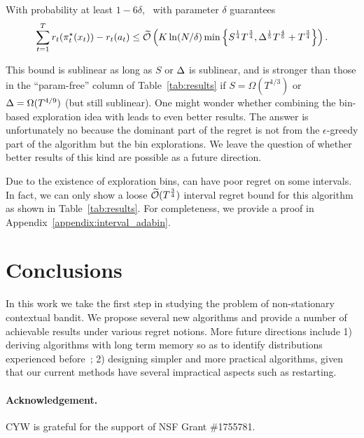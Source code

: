 
\begin{theorem} 
\label{thm:Ada3 regret}
With probability at least $1-6\delta$, \AdaBIN\ with parameter $\delta$ guarantees
\begin{align*}
\sum_{t=1}^T r_t(\pi_t^\star(x_t))-r_t(a_t) \leq \widetilde{\mathcal{O}}\left(K\ln(N/\delta) \min\left\{S^{\frac{1}{4}}T^{\frac{3}{4}}, \Delta^{\frac{1}{5}}T^{\frac{4}{5}}+T^{\frac{3}{4}} \right\} \right).
\end{align*}
\end{theorem}

This bound is sublinear as long as $S$ or $\Delta$ is sublinear, 
and is stronger than those in the ``param-free'' column of Table~\ref{tab:results} if $S = \Omega(T^{1/3})$ or $\Delta = \Omega(T^{4/9})$ (but still sublinear).
One might wonder whether combining the bin-based exploration idea with \AdaILTCB leads to even better results.
The answer is unfortunately no because the dominant part of the regret is not from the $\epsilon$-greedy part of the algorithm but the bin explorations.
We leave the question of whether better results of this kind are possible as a future direction.

Due to the existence of exploration bins, \AdaBIN can have poor regret on some intervals. In fact, we can only show a loose $\widetilde{\mathcal{O}}({T^{\frac{3}{4}}})$ interval regret bound for this algorithm as shown in Table~\ref{tab:results}. For completeness, we provide a proof in Appendix~\ref{appendix:interval_adabin}. 

\section{Conclusions}
In this work we take the first step in studying the problem of non-stationary contextual bandit. 
We propose several new algorithms and provide a number of achievable results under various regret notions.
More future directions include 1) deriving algorithms with long term memory so as to identify distributions experienced before~\citep{bousquet2002tracking};
2) designing simpler and more practical algorithms, given that our current methods have several impractical aspects such as restarting.

\paragraph{Acknowledgement.}
CYW is grateful for the support of NSF Grant \#1755781.

